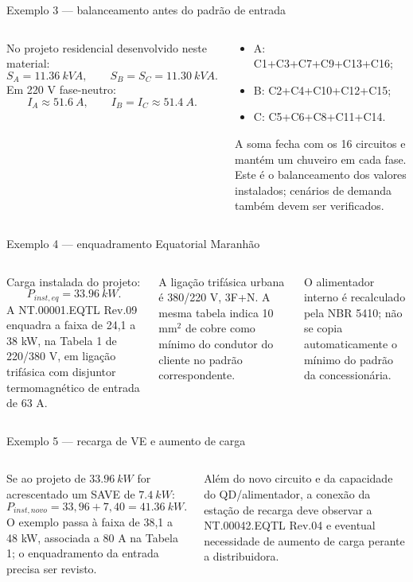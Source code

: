 \begin{frame}{Exemplo 3 — balanceamento antes do padrão de entrada}
\small
\begin{columns}[T,onlytextwidth]
No projeto residencial desenvolvido neste material:
\[
S_A=\SI{11.36}{kVA},\qquad S_B=S_C=\SI{11.30}{kVA}.
\]
Em 220 V fase-neutro:
\[
I_A\approx\SI{51.6}{A},\qquad I_B=I_C\approx\SI{51.4}{A}.
\]
\begin{caixaProjeto}[title=Distribuição]
\begin{itemize}
\item A: C1+C3+C7+C9+C13+C16;
\item B: C2+C4+C10+C12+C15;
\item C: C5+C6+C8+C11+C14.
\end{itemize}
A soma fecha com os 16 circuitos e mantém um chuveiro em cada fase. Este é o balanceamento dos valores instalados; cenários de demanda também devem ser verificados.
\end{caixaProjeto}
\end{columns}
\end{frame}

\begin{frame}{Exemplo 4 — enquadramento Equatorial Maranhão}
\small
\begin{columns}[T,onlytextwidth]
Carga instalada do projeto:
\[
P_{inst,eq}=\SI{33.96}{kW}.
\]
A NT.00001.EQTL Rev.09 enquadra a faixa de 24,1 a 38 kW, na Tabela 1 de 220/380 V, em ligação trifásica com disjuntor termomagnético de entrada de 63 A.
\begin{caixaNorma}[title=No Maranhão]
A ligação trifásica urbana é 380/220 V, 3F+N. A mesma tabela indica 10 mm$^2$ de cobre como mínimo do condutor do cliente no padrão correspondente.
\end{caixaNorma}
\begin{caixaAt}
O alimentador interno é recalculado pela NBR 5410; não se copia automaticamente o mínimo do padrão da concessionária.
\end{caixaAt}
\end{columns}
\end{frame}

\begin{frame}{Exemplo 5 — recarga de VE e aumento de carga}
\small
\begin{columns}[T,onlytextwidth]
Se ao projeto de $\SI{33.96}{kW}$ for acrescentado um SAVE de $\SI{7.4}{kW}$:
\[
P_{inst,novo}=33{,}96+7{,}40=\SI{41.36}{kW}.
\]
O exemplo passa à faixa de 38,1 a 48 kW, associada a 80 A na Tabela 1; o enquadramento da entrada precisa ser revisto.
\begin{caixaProjeto}[title=Consequência]
Além do novo circuito e da capacidade do QD/alimentador, a conexão da estação de recarga deve observar a NT.00042.EQTL Rev.04 e eventual necessidade de aumento de carga perante a distribuidora.
\end{caixaProjeto}
\end{columns}
\end{frame}

